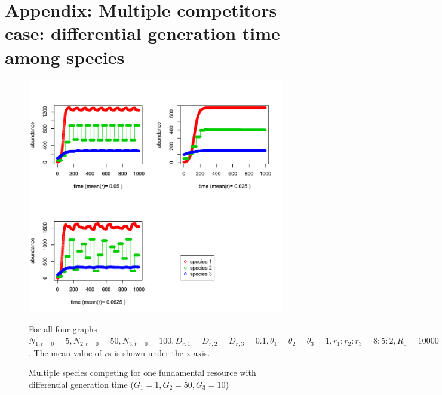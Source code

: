 \documentclass[12pt]{article}
\begin{document}
\section{Appendix: Multiple competitors case: differential generation time among species}
\begin{figure}
 \includegraphics[width=\textwidth]{oscillation_r_effect.pdf}
 \caption{Multiple species competing for one fundamental resource with differential generation time ($G_1=1, G_2=50, G_3=10$)}
For all four graphs $ N_{1,t=0}=5, N_{2,t=0}=50,N_{3,t=0}=100, D_{r,1}=D_{r,2}=D_{r,3}=0.1, \theta_1=\theta_2=\theta_3=1, r_1: r_2:r_3= 8:5:2, R_0=10000$. The mean value of $r$s is shown under the x-axis.
\end{figure}
\end{document}
